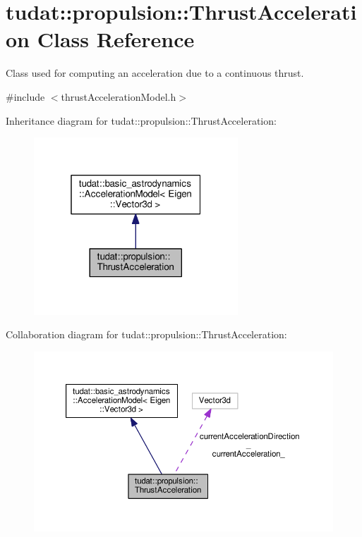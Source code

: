 \hypertarget{classtudat_1_1propulsion_1_1ThrustAcceleration}{}\section{tudat\+:\+:propulsion\+:\+:Thrust\+Acceleration Class Reference}
\label{classtudat_1_1propulsion_1_1ThrustAcceleration}


Class used for computing an acceleration due to a continuous thrust.  




{\ttfamily \#include $<$thrust\+Acceleration\+Model.\+h$>$}



Inheritance diagram for tudat\+:\+:propulsion\+:\+:Thrust\+Acceleration\+:
\nopagebreak
\begin{figure}[H]
\begin{center}
\leavevmode
\includegraphics[width=217pt]{classtudat_1_1propulsion_1_1ThrustAcceleration__inherit__graph}
\end{center}
\end{figure}


Collaboration diagram for tudat\+:\+:propulsion\+:\+:Thrust\+Acceleration\+:
\nopagebreak
\begin{figure}[H]
\begin{center}
\leavevmode
\includegraphics[width=350pt]{classtudat_1_1propulsion_1_1ThrustAcceleration__coll__graph}
\end{center}
\end{figure}

